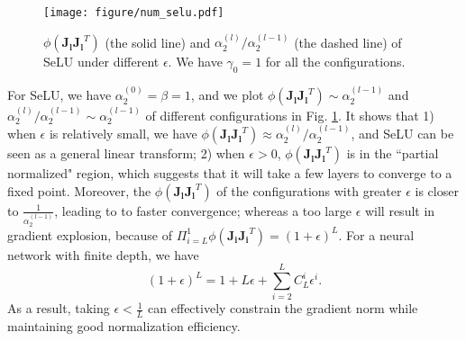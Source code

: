 \documentclass[10pt,journal,compsoc]{IEEEtran}
\begin{document}
\begin{figure}[ht]
\vspace{-10pt}
\centering
\texttt{[image: figure/num\_selu.pdf]}
\caption{$\phi(\mathbf{J_lJ_l}^T)$ (the solid line) and $\alpha_2^{(l)}/\alpha_2^{(l-1)}$ (the dashed line) of SeLU under different $\epsilon$. We have $\gamma_0=1$ for all the configurations.}
\label{fig:num_selu}
\vspace{-5pt}
\end{figure}

For SeLU, we have $\alpha_2^{(0)}\!=\!\beta\!=\!1$, and we plot $\phi(\mathbf{J_lJ_l}^T)\sim \alpha_2^{(l-1)}$ and $\alpha_2^{(l)}/\alpha_2^{(l-1)}\sim \alpha_2^{(l-1)}$ of different configurations in Fig. \ref{fig:num_selu}. It shows that 1) when $\epsilon$ is relatively small, we have $\phi(\mathbf{J_lJ_l}^T)\approx\alpha_2^{(l)}/\alpha_2^{(l-1)}$, and SeLU can be seen as a general linear transform; 2) when $\epsilon>0$, $\phi(\mathbf{J_lJ_l}^T)$ is in the ``partial normalized" region, which suggests that it will take a few layers to converge to a fixed point. Moreover, the $\phi(\mathbf{J_lJ_l}^T)$ of the configurations with greater $\epsilon$ is closer to $\frac{1}{\alpha_2^{(l-1)}}$, leading to to faster convergence; whereas a too large $\epsilon$ will result in gradient explosion, because of $\Pi_{i=L}^1\phi(\mathbf{J_iJ_i}^T)=(1+\epsilon)^L$. For a neural network with finite depth, we have
\begin{equation}
    (1+\epsilon)^L = 1 + L\epsilon + \sum_{i=2}^LC_L^i\epsilon^i.
\end{equation}
As a result, taking $\epsilon < \frac{1}{L}$ can effectively constrain the gradient norm while maintaining good normalization efficiency.
 \vspace{-10pt}
\end{document}
